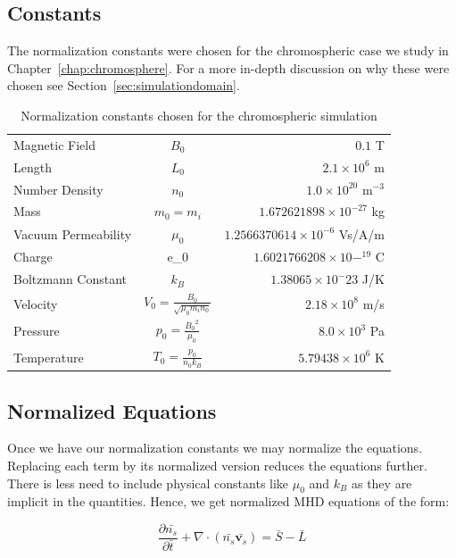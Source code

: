 \documentclass[12pt,upcase]{umlthesis}
\begin{document}
\subsection{Constants}\label{sec:normconstants}

The normalization constants were chosen for the chromospheric case we study in Chapter~\ref{chap:chromosphere}. For a more in-depth discussion on why these were chosen see Section~\ref{sec:simulationdomain}.

\begin{table}[h]\label{tab:normalization}
\centering
\caption[Normalization Constants]{Normalization constants chosen for the chromospheric simulation}
\begin{tabular}[]{l  c  r}
	\toprule
	Magnetic Field & $B_0$ & $0.1$ T\\
	Length & $L_0$ & $2.1\times 10^6$ m \\
	Number Density & $n_0$ & $1.0\times 10^{20}$ m$^{-3}$ \\
	Mass & $m_0 = m_i$ & $1.672621898\times10^{−27}$ kg \\
	Vacuum Permeability & $\mu_0$ & $1.2566370614\times 10^{−6}$ Vs/A/m \\
	Charge & e_0 & $1.6021766208\times10−^{19}$ C \\
	Boltzmann Constant & $k_B$ & $1.38065\times10^-{23}$ J/K\\
	Velocity & $V_0=\frac{B_0}{\sqrt{\mu_0 m_i n_0}}$ & $2.18 \times 10^{8}$ m/s\\
	Pressure & $p_0= \frac{{B_0}^2}{\mu_0}$ & $8.0 \times 10^3$ Pa \\
	Temperature & $T_0 = \frac{p_0}{n_0 k_B} $ & $5.79438\times10^6$ K\\
	\bottomrule
\end{tabular}
\end{table}

\subsection{Normalized Equations}\label{sec:normequations}

Once we have our normalization constants we may normalize the equations. Replacing each term by its normalized version reduces the equations further. There is less need to include physical constants like $\mu_0$ and $k_B$ as they are implicit in the quantities. Hence, we get normalized MHD equations of the form:

\begin{equation}\label{eq:normcontinuity}
	\frac{\partial \bar{n_s}}{\partial \bar{t}} + \nabla \cdot (\bar{n_s} \bar{\textbf{v}_s}) = \bar{S} - \bar{L}
\end{equation}
\end{document}
